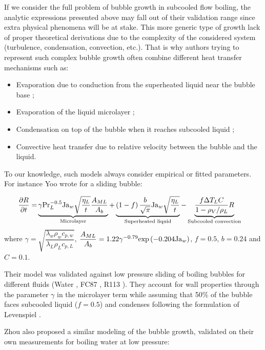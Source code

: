 If we consider the full problem of bubble growth in subcooled flow boiling, the analytic expressions presented above may fall out of their validation range since extra physical phenomena will be at stake. This more generic type of growth lack of proper theoretical derivations due to the complexity of the considered system (turbulence, condensation, convection, etc.). That is why authors trying to represent such complex bubble growth often combine different heat transfer mechanisms such as: 

\begin{itemize}
\item Evaporation due to conduction from the superheated liquid near the bubble base ;
\item Evaporation of the liquid microlayer ;
\item Condensation on top of the bubble when it reaches subcooled liquid ;
\item Convective heat transfer due to relative velocity between the bubble and the liquid.
\end{itemize}

To our knowledge, such models always consider empirical or fitted parameters. For instance Yoo \etal \cite{yoo_development_2018} wrote for a sliding bubble:


\begin{align}
 \frac{\partial{R}}{\partial t} = &\underbrace{ \gamma \mathrm{Pr}_{L}^{-0.5}\mathrm{Ja}_{w} \sqrt{\dfrac{\eta_{L}}{t}} \frac{A_{ML}}{A_{b}} }_{\text{Microlayer}} + \underbrace{\left( 1-f \right) \frac{b}{\sqrt{\pi}} \mathrm{Ja}_{w} \sqrt{\dfrac{\eta_{L}}{t}}}_{\text{Superheated liquid}} - \underbrace{\frac{f\Delta T_{L}C}{1-\rho_{V}/\rho_{L}}R}_{\text{Subcooled convection}}
\label{eq:growth_yoo}
\end{align}
where $\gamma = \sqrt{\dfrac{\lambda_{w}\rho_{w}c_{p,w}}{\lambda_{L}\rho_{L}c_{p,L}}}$, $\dfrac{A_{ML}}{A_{b}}=1.22 \gamma^{-0.79}\mathrm{exp}\left( -0.204\mathrm{Ja}_{w} \right)$, $f=0.5$, $b=0.24$ and $C=0.1$.

\npar
Their model was validated against low pressure sliding of boiling bubbles for different fluids (Water \cite{maity_effect_2000}, FC87 \cite{thorncroft_experimental_1998}, R113 \cite{yoo_experimental_2016}). They account for wall properties through the parameter $\gamma$ in the microlayer term while assuming that 50\% of the bubble faces subcooled liquid ($f=0.5$) and condenses following the formulation of Levenspiel \cite{levenspiel_collapse_1959}.


\npar

Zhou \etal \cite{zhou_experimental_2020} also proposed a similar modeling of the bubble growth, validated on their own measurements for boiling water at low pressure:


